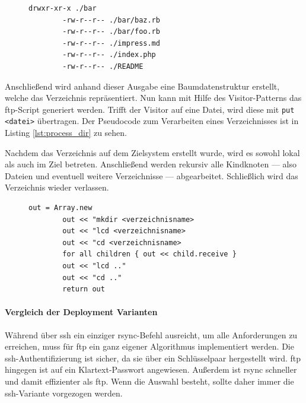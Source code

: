 \begin{figure}
	\begin{lstlisting}[caption=Beispielausgabe für gefundene Pfade,label={lst:gen_path_list_example}]
		drwxr-xr-x ./bar
		-rw-r--r-- ./bar/baz.rb
		-rw-r--r-- ./bar/foo.rb
		-rw-r--r-- ./impress.md
		-rw-r--r-- ./index.php
		-rw-r--r-- ./README
	\end{lstlisting}
\end{figure}
     
Anschließend wird anhand dieser Ausgabe eine Baumdatenstruktur erstellt, welche das Verzeichnis repräsentiert. Nun kann mit Hilfe des Visitor-Patterns das \gls{ftp}-Script generiert werden. Trifft der Visitor auf eine Datei, wird diese mit \lstinline!put <datei>! übertragen. Der Pseudocode zum Verarbeiten eines Verzeichnisses ist in Listing \ref{lst:process_dir} zu sehen.

Nachdem das Verzeichnis auf dem Zielsystem erstellt wurde, wird es sowohl lokal als auch im Ziel betreten. Anschließend werden rekursiv alle Kindknoten — also Dateien und eventuell weitere Verzeichnisse — abgearbeitet. Schließlich wird das Verzeichnis wieder verlassen.

\begin{figure}
	\begin{lstlisting}[caption=Verarbeitung eines Verzeichnisses,label={lst:process_dir}]
		out = Array.new
		out << "mkdir <verzeichnisname>
		out << "lcd <verzeichnisname>
		out << "cd <verzeichnisname>
		for all children { out << child.receive }
		out << "lcd .."
		out << "cd .."
		return out
	\end{lstlisting}
\end{figure}


\paragraph{Vergleich der Deployment Varianten} %
\label{ssub:vergleich_der_deployment_varianten}

Während über \gls{ssh} ein einziger rsync-Befehl ausreicht, um alle Anforderungen zu erreichen, muss für \gls{ftp} ein ganz eigener Algorithmus implementiert werden. Die \gls{ssh}-Authentifizierung ist sicher, da sie über ein Schlüsselpaar hergestellt wird. \gls{ftp} hingegen ist auf ein Klartext-Passwort angewiesen. Außerdem ist rsync schneller und damit effizienter als \gls{ftp}. Wenn die Auswahl besteht, sollte daher immer die \gls{ssh}-Variante vorgezogen werden.

